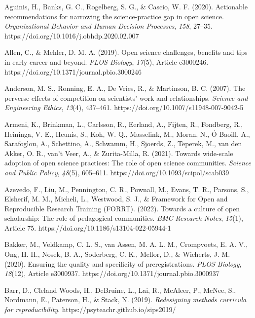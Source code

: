 \documentclass[meta, authordate]{jote-new-article}
\begin{document}
Aguinis, H., Banks, G. C., Rogelberg, S. G., & Cascio, W. F. (2020). Actionable recommendations for narrowing the science-practice gap in open science. \emph{Organizational Behavior and Human Decision Processes}, \emph{158}, 27–35. https://doi.org/10.1016/j.obhdp.2020.02.007



Allen, C., & Mehler, D. M. A. (2019). Open science challenges, benefits and tips in early career and beyond. \emph{PLOS Biology}, \emph{17}(5), Article e3000246. https://doi.org/10.1371/journal.pbio.3000246



Anderson, M. S., Ronning, E. A., De Vries, R., & Martinson, B. C. (2007). The perverse effects of competition on scientists’ work and relationships. \emph{Science and Engineering Ethics}, \emph{13}(4), 437–461. https://doi.org/10.1007/s11948-007-9042-5



Armeni, K., Brinkman, L., Carlsson, R., Eerland, A., Fijten, R., Fondberg, R., Heininga, V. E., Heunis, S., Koh, W. Q., Masselink, M., Moran, N., Ó Baoill, A., Sarafoglou, A., Schettino, A., Schwamm, H., Sjoerds, Z., Teperek, M., van den Akker, O. R., van’t Veer, A., & Zurita-Milla, R. (2021). Towards wide-scale adoption of open science practices: The role of open science communities. \emph{Science and Public Policy}, \emph{48}(5), 605–611. https://doi.org/10.1093/scipol/scab039



Azevedo, F., Liu, M., Pennington, C. R., Pownall, M., Evans, T. R., Parsons, S., Elsherif, M. M., Micheli, L., Westwood, S. J., & Framework for Open and Reproducible Research Training (FORRT). (2022). Towards a culture of open scholarship: The role of pedagogical communities. \emph{BMC Research Notes}, \emph{15}(1), Article 75. https://doi.org/10.1186/s13104-022-05944-1



Bakker, M., Veldkamp, C. L. S., van Assen, M. A. L. M., Crompvoets, E. A. V., Ong, H. H., Nosek, B. A., Soderberg, C. K., Mellor, D., & Wicherts, J. M. (2020). Ensuring the quality and specificity of preregistrations. \emph{PLOS Biology}, \emph{18}(12), Article e3000937. https://doi.org/10.1371/journal.pbio.3000937



Barr, D., Cleland Woods, H., DeBruine, L., Lai, R., McAleer, P., McNee, S., Nordmann, E., Paterson, H., & Stack, N. (2019). \emph{Redesigning methods curricula for reproducibility}. https://psyteachr.github.io/sips2019/
\end{document}
